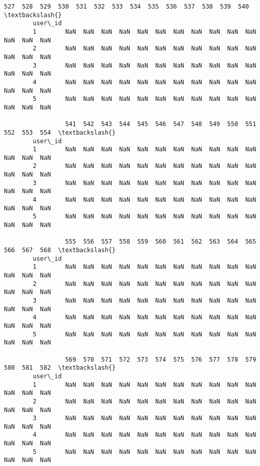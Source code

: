 \documentclass[11pt]{article}
\begin{document}
\begin{Verbatim}[commandchars=\\\{\}]
                 527  528  529  530  531  532  533  534  535  536  537  538  539  540  \textbackslash{}
        user\_id                                                                         
        1        NaN  NaN  NaN  NaN  NaN  NaN  NaN  NaN  NaN  NaN  NaN  NaN  NaN  NaN   
        2        NaN  NaN  NaN  NaN  NaN  NaN  NaN  NaN  NaN  NaN  NaN  NaN  NaN  NaN   
        3        NaN  NaN  NaN  NaN  NaN  NaN  NaN  NaN  NaN  NaN  NaN  NaN  NaN  NaN   
        4        NaN  NaN  NaN  NaN  NaN  NaN  NaN  NaN  NaN  NaN  NaN  NaN  NaN  NaN   
        5        NaN  NaN  NaN  NaN  NaN  NaN  NaN  NaN  NaN  NaN  NaN  NaN  NaN  NaN   
        
                 541  542  543  544  545  546  547  548  549  550  551  552  553  554  \textbackslash{}
        user\_id                                                                         
        1        NaN  NaN  NaN  NaN  NaN  NaN  NaN  NaN  NaN  NaN  NaN  NaN  NaN  NaN   
        2        NaN  NaN  NaN  NaN  NaN  NaN  NaN  NaN  NaN  NaN  NaN  NaN  NaN  NaN   
        3        NaN  NaN  NaN  NaN  NaN  NaN  NaN  NaN  NaN  NaN  NaN  NaN  NaN  NaN   
        4        NaN  NaN  NaN  NaN  NaN  NaN  NaN  NaN  NaN  NaN  NaN  NaN  NaN  NaN   
        5        NaN  NaN  NaN  NaN  NaN  NaN  NaN  NaN  NaN  NaN  NaN  NaN  NaN  NaN   
        
                 555  556  557  558  559  560  561  562  563  564  565  566  567  568  \textbackslash{}
        user\_id                                                                         
        1        NaN  NaN  NaN  NaN  NaN  NaN  NaN  NaN  NaN  NaN  NaN  NaN  NaN  NaN   
        2        NaN  NaN  NaN  NaN  NaN  NaN  NaN  NaN  NaN  NaN  NaN  NaN  NaN  NaN   
        3        NaN  NaN  NaN  NaN  NaN  NaN  NaN  NaN  NaN  NaN  NaN  NaN  NaN  NaN   
        4        NaN  NaN  NaN  NaN  NaN  NaN  NaN  NaN  NaN  NaN  NaN  NaN  NaN  NaN   
        5        NaN  NaN  NaN  NaN  NaN  NaN  NaN  NaN  NaN  NaN  NaN  NaN  NaN  NaN   
        
                 569  570  571  572  573  574  575  576  577  578  579  580  581  582  \textbackslash{}
        user\_id                                                                         
        1        NaN  NaN  NaN  NaN  NaN  NaN  NaN  NaN  NaN  NaN  NaN  NaN  NaN  NaN   
        2        NaN  NaN  NaN  NaN  NaN  NaN  NaN  NaN  NaN  NaN  NaN  NaN  NaN  NaN   
        3        NaN  NaN  NaN  NaN  NaN  NaN  NaN  NaN  NaN  NaN  NaN  NaN  NaN  NaN   
        4        NaN  NaN  NaN  NaN  NaN  NaN  NaN  NaN  NaN  NaN  NaN  NaN  NaN  NaN   
        5        NaN  NaN  NaN  NaN  NaN  NaN  NaN  NaN  NaN  NaN  NaN  NaN  NaN  NaN   
        

\end{Verbatim}
\end{document}
